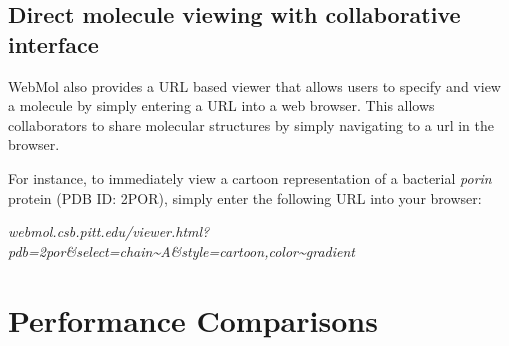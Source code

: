 \documentclass[]{bioinfo}
\begin{document}
\subsection{Direct molecule viewing with collaborative interface}
WebMol also provides a URL based viewer that allows users to specify and view a molecule by simply entering a URL into a web browser.  This allows collaborators to share molecular structures by simply navigating to a url in the browser. 

For instance, to immediately view a cartoon representation of a bacterial \emph{porin} protein (PDB ID: 2POR), simply enter the following URL into your browser:

\emph{webmol.csb.pitt.edu/viewer.html?pdb=2por\&select=chain\~{}A\&style=cartoon,color\~{}gradient}

\section{Performance Comparisons}
\end{document}
